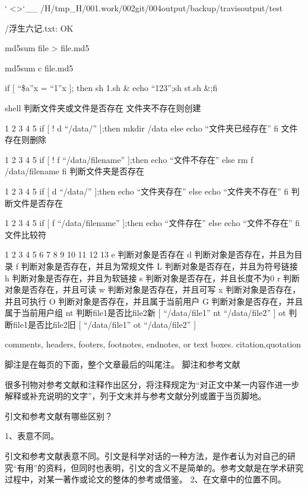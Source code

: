 \documentclass[letterpaper,12pt,english]{sphinxmanual}
\begin{document}
` <>`\_\_
/H/tmp\_H/001.work/002git/004output/backup/travis\sphinxhyphen{}output/test

/浮生六记.txt: OK

md5sum file > file.md5

md5sum \sphinxhyphen{}c file.md5

if {[} “\$a”x = “1”x {]}; then sh 1.sh \& echo “123”;sh st.sh \&;fi

shell 判断文件夹或文件是否存在
文件夹不存在则创建

1
2
3
4
5
if {[} ! \sphinxhyphen{}d “/data/” {]};then
mkdir /data
else
echo “文件夹已经存在”
fi
文件存在则删除

1
2
3
4
5
if {[} ! \sphinxhyphen{}f “/data/filename” {]};then
echo “文件不存在”
else
rm \sphinxhyphen{}f /data/filename
fi
判断文件夹是否存在

1
2
3
4
5
if {[} \sphinxhyphen{}d “/data/” {]};then
echo “文件夹存在”
else
echo “文件夹不存在”
fi
判断文件是否存在

1
2
3
4
5
if {[} \sphinxhyphen{}f “/data/filename” {]};then
echo “文件存在”
else
echo “文件不存在”
fi
文件比较符

1
2
3
4
5
6
7
8
9
10
11
12
13
\sphinxhyphen{}e 判断对象是否存在
\sphinxhyphen{}d 判断对象是否存在，并且为目录
\sphinxhyphen{}f 判断对象是否存在，并且为常规文件
\sphinxhyphen{}L 判断对象是否存在，并且为符号链接
\sphinxhyphen{}h 判断对象是否存在，并且为软链接
\sphinxhyphen{}s 判断对象是否存在，并且长度不为0
\sphinxhyphen{}r 判断对象是否存在，并且可读
\sphinxhyphen{}w 判断对象是否存在，并且可写
\sphinxhyphen{}x 判断对象是否存在，并且可执行
\sphinxhyphen{}O 判断对象是否存在，并且属于当前用户
\sphinxhyphen{}G 判断对象是否存在，并且属于当前用户组
\sphinxhyphen{}nt 判断file1是否比file2新  {[} “/data/file1” \sphinxhyphen{}nt “/data/file2” {]}
\sphinxhyphen{}ot 判断file1是否比file2旧  {[} “/data/file1” \sphinxhyphen{}ot “/data/file2” {]}

comments, headers, footers, footnotes, endnotes, or text boxes.
citation,quotation

脚注是在每页的下面，整个文章最后的叫尾注。
脚注和参考文献

很多刊物对参考文献和注释作出区分，将注释规定为“对正文中某一内容作进一步解释或补充说明的文字”，列于文末并与参考文献分列或置于当页脚地。

引文和参考文献有哪些区别？

1、表意不同。

引文和参考文献表意不同。引文是科学对话的一种方法，是作者认为对自己的研究“有用”的资料，但同时也表明，引文的含义不是简单的。参考文献是在学术研究过程中，对某一著作或论文的整体的参考或借鉴。
2、在文章中的位置不同。
\end{document}
